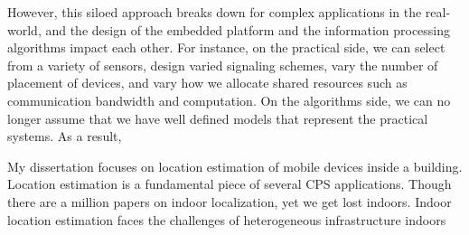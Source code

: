 \documentclass[10pt]{article}
\begin{document}
However, this siloed approach breaks down for complex applications in the real-world, and the design of the embedded platform and the information processing algorithms impact each other. For instance, on the practical side, we can select from a variety of sensors, design varied signaling schemes, vary the number of placement of devices, and vary how we allocate shared resources such as communication bandwidth and computation. On the algorithms side, we can no longer assume that we have well defined models that represent the practical systems. As a result, 

My dissertation focuses on location estimation of mobile devices inside a building. Location estimation is a fundamental piece of several CPS applications. Though there are a million papers on indoor localization, yet we get lost indoors. Indoor location estimation faces the challenges of heterogeneous infrastructure indoors 

\end{document}
